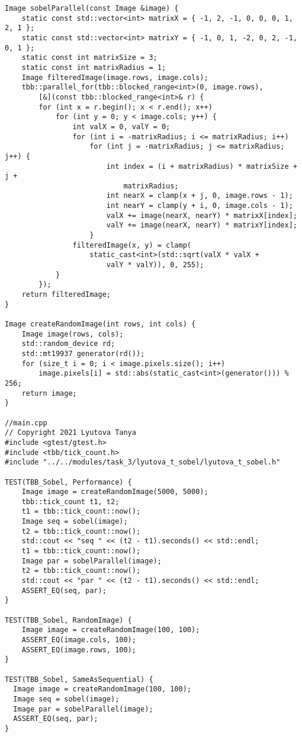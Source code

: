 \documentclass{report}
\begin{document}
\begin{lstlisting}
Image sobelParallel(const Image &image) {
    static const std::vector<int> matrixX = { -1, 2, -1, 0, 0, 0, 1, 2, 1 };
    static const std::vector<int> matrixY = { -1, 0, 1, -2, 0, 2, -1, 0, 1 };
    static const int matrixSize = 3;
    static const int matrixRadius = 1;
    Image filteredImage(image.rows, image.cols);
    tbb::parallel_for(tbb::blocked_range<int>(0, image.rows),
        [&](const tbb::blocked_range<int>& r) {
        for (int x = r.begin(); x < r.end(); x++)
            for (int y = 0; y < image.cols; y++) {
                int valX = 0, valY = 0;
                for (int i = -matrixRadius; i <= matrixRadius; i++)
                    for (int j = -matrixRadius; j <= matrixRadius; j++) {
                        int index = (i + matrixRadius) * matrixSize + j +
                            matrixRadius;
                        int nearX = clamp(x + j, 0, image.rows - 1);
                        int nearY = clamp(y + i, 0, image.cols - 1);
                        valX += image(nearX, nearY) * matrixX[index];
                        valY += image(nearX, nearY) * matrixY[index];
                    }
                filteredImage(x, y) = clamp(
                    static_cast<int>(std::sqrt(valX * valX +
                        valY * valY)), 0, 255);
            }
        });
    return filteredImage;
}

Image createRandomImage(int rows, int cols) {
    Image image(rows, cols);
    std::random_device rd;
    std::mt19937 generator(rd());
    for (size_t i = 0; i < image.pixels.size(); i++)
        image.pixels[i] = std::abs(static_cast<int>(generator())) % 256;
    return image;
}

//main.cpp
// Copyright 2021 Lyutova Tanya
#include <gtest/gtest.h>
#include <tbb/tick_count.h>
#include "../../modules/task_3/lyutova_t_sobel/lyutova_t_sobel.h"

TEST(TBB_Sobel, Performance) {
    Image image = createRandomImage(5000, 5000);
    tbb::tick_count t1, t2;
    t1 = tbb::tick_count::now();
    Image seq = sobel(image);
    t2 = tbb::tick_count::now();
    std::cout << "seq " << (t2 - t1).seconds() << std::endl;
    t1 = tbb::tick_count::now();
    Image par = sobelParallel(image);
    t2 = tbb::tick_count::now();
    std::cout << "par " << (t2 - t1).seconds() << std::endl;
    ASSERT_EQ(seq, par);
}

TEST(TBB_Sobel, RandomImage) {
    Image image = createRandomImage(100, 100);
    ASSERT_EQ(image.cols, 100);
    ASSERT_EQ(image.rows, 100);
}

TEST(TBB_Sobel, SameAsSequential) {
  Image image = createRandomImage(100, 100);
  Image seq = sobel(image);
  Image par = sobelParallel(image);
  ASSERT_EQ(seq, par);
}


\end{lstlisting}
\end{document}
